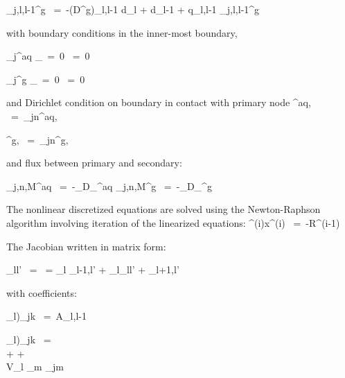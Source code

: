 \documentclass[12pt]{article}
\def\EQ#1\EN{\begin{equation}#1\end{equation}}
\def\BA#1\EA{\begin{align}#1\end{align}}
\newcommand{\eq}{\ =\ }
\begin{document}
\EQ
\Omega_{j,l,l-1}^g \eq -(\varphi D^g)_{l,l-1}  {d_l + d_{l-1} } + q_{l,l-1} \Psi_{j,l,l-1}^g
\EN

with boundary conditions in the inner-most boundary,

\EQ
\Omega_j^{aq} \vert_{\xi\eq0} \eq 0
\EN

\EQ
\Omega_j^{g} \vert_{\xi\eq0} \eq 0
\EN

and Dirichlet condition on boundary in contact with primary node
\EQ
    {\Psi_{jM}}^{aq,\beta} \eq {\Psi_{jn}}^{aq,\alpha}
\EN

\EQ
    {\Psi_{jM}}^{g,\beta} \eq {\Psi_{jn}}^{g,\alpha}
\EN

and flux between primary and secondary:

\EQ
\Omega_{j,n,M}^{aq} \eq -\phi_\beta D_\beta^{aq} 
\EN
\EQ
\Omega_{j,n,M}^{g} \eq -\phi_\beta D_\beta^{g} 
\EN

The nonlinear discretized equations are solved using the Newton-Raphson algorithm involving iteration of the linearized equations:
\EQ
J^{(i)}\delta x^{(i)} \eq -R^{(i-1)}
\EN

The Jacobian written in matrix form:

\EQ
J_{ll'} \eq {} = \beta_{l} \delta_{l-1,l'} + \alpha_{l}\delta_{ll'} + \gamma \delta_{l+1,l'}
\EN

with coefficients:

\EQ
(\beta_l)_{jk} \eq  A_{l,l-1}
\EN

\BA
(\alpha_l)_{jk} \eq {} \\
    +  
    + \\ V_l \sum_m \nu_{jm} 
   \EA
\end{document}
